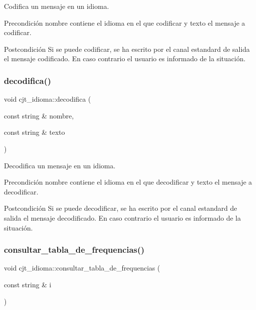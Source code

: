 Codifica un mensaje en un idioma. 

\begin{DoxyPrecond}{Precondición}
nombre contiene el idioma en el que codificar y texto el mensaje a codificar. 
\end{DoxyPrecond}
\begin{DoxyPostcond}{Postcondición}
Si se puede codificar, se ha escrito por el canal estandard de salida el mensaje codificado. En caso contrario el usuario es informado de la situación. 
\end{DoxyPostcond}
\mbox{\label{classcjt__idioma_a25ee22b5af84a8ce22de2cee8128a08c}} 
\subsubsection{\texorpdfstring{decodifica()}{decodifica()}}
{\footnotesize\ttfamily void cjt\+\_\+idioma\+::decodifica (\begin{DoxyParamCaption}\item[{const string \&}]{nombre,  }\item[{const string \&}]{texto }\end{DoxyParamCaption})}



Decodifica un mensaje en un idioma. 

\begin{DoxyPrecond}{Precondición}
nombre contiene el idioma en el que decodificar y texto el mensaje a decodificar. 
\end{DoxyPrecond}
\begin{DoxyPostcond}{Postcondición}
Si se puede decodificar, se ha escrito por el canal estandard de salida el mensaje decodificado. En caso contrario el usuario es informado de la situación. 
\end{DoxyPostcond}
\mbox{\label{classcjt__idioma_ae2ab9ad48166bad14e113f748d1a888c}} 
\subsubsection{\texorpdfstring{consultar\+\_\+tabla\+\_\+de\+\_\+frequencias()}{consultar\_tabla\_de\_frequencias()}}
{\footnotesize\ttfamily void cjt\+\_\+idioma\+::consultar\+\_\+tabla\+\_\+de\+\_\+frequencias (\begin{DoxyParamCaption}\item[{const string \&}]{i }\end{DoxyParamCaption})}



